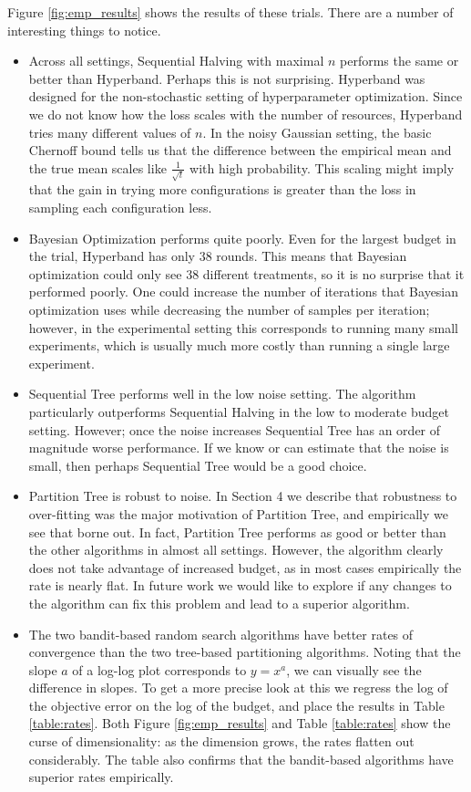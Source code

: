\documentclass[11pt]{article}
\begin{document}
Figure \ref{fig:emp_results} shows the results of these trials. There are a number of interesting things to notice. 
\begin{itemize}
\item Across all settings, Sequential Halving with maximal $n$ performs the same or better than Hyperband. Perhaps this is not surprising. Hyperband was designed for the non-stochastic setting of hyperparameter optimization. Since we do not know how the loss scales with the number of resources, Hyperband tries many different values of $n$. In the noisy Gaussian setting, the basic Chernoff bound tells us that the difference between the empirical mean and the true mean scales like $\frac{1}{\sqrt t}$ with high probability. This scaling might imply that the gain in trying more configurations is greater than the loss in sampling each configuration less.
\item Bayesian Optimization performs quite poorly. Even for the largest budget in the trial, Hyperband has only 38 rounds. This means that Bayesian optimization could only see 38 different treatments, so it is no surprise that it performed poorly. One could increase the number of iterations that Bayesian optimization uses while decreasing the number of samples per iteration; however, in the experimental setting this corresponds to running many small experiments, which is usually much more costly than running a single large experiment.
\item Sequential Tree performs well in the low noise setting. The algorithm particularly outperforms Sequential Halving in the low to moderate budget setting. However; once the noise increases Sequential Tree has an order of magnitude worse performance. If we know or can estimate that the noise is small, then perhaps Sequential Tree would be a good choice.
\item Partition Tree is robust to noise. In Section 4 we describe that robustness to over-fitting was the major motivation of Partition Tree, and empirically we see that borne out. In fact, Partition Tree performs as good or better than the other algorithms in almost all settings. However, the algorithm clearly does not take advantage of increased budget, as in most cases empirically the rate is nearly flat. In future work we would like to explore if any changes to the algorithm can fix this problem and lead to a superior algorithm. 
\item The two bandit-based random search algorithms have better rates of convergence than the two tree-based partitioning algorithms. Noting that the slope $a$ of a log-log plot corresponds to $y = x^a$, we can visually see the difference in slopes. To get a more precise look at this we regress the log of the objective error on the log of the budget, and place the results in Table \ref{table:rates}. Both Figure \ref{fig:emp_results} and Table \ref{table:rates} show the curse of dimensionality: as the dimension grows, the rates flatten out considerably. The table also confirms that the bandit-based algorithms have superior rates empirically.
\end{itemize}
\end{document}
